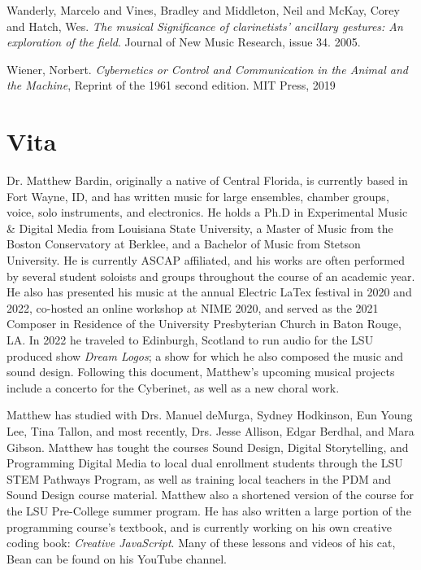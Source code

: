 \begin{thebibliography}{99}
 Wanderly, Marcelo and Vines, Bradley and Middleton, Neil and McKay, Corey and Hatch, Wes. \emph{The musical Significance of clarinetists' ancillary gestures: An exploration of the field}. Journal of New Music Research, issue 34. 2005.

 Wiener, Norbert. \emph{Cybernetics or Control and Communication in the Animal and the Machine}, Reprint of the 1961 second edition. MIT Press, 2019




\end{thebibliography}


\chapter{Vita}

Dr. Matthew Bardin, originally a native of Central Florida, is currently based in Fort Wayne, ID, and has written music for large ensembles, chamber groups, voice, solo instruments, and electronics. He holds a Ph.D in Experimental Music \& Digital Media from Louisiana State University, a Master of Music from the Boston Conservatory at Berklee, and a  Bachelor of Music from Stetson University. He is currently ASCAP affiliated, and his works are often performed by several student soloists and groups throughout the course of an academic year. He also has presented his music at the annual Electric LaTex festival in 2020 and 2022, co-hosted an online workshop at NIME 2020, and served as the 2021 Composer in Residence of the University Presbyterian Church in Baton Rouge, LA. In 2022 he traveled to Edinburgh, Scotland to run audio for the LSU produced show \textit{Dream Logos}; a show for which he also composed the music and sound design. Following this document, Matthew's upcoming musical projects include a concerto for the Cyberinet, as well as a new choral work.

Matthew has studied with Drs. Manuel deMurga, Sydney Hodkinson, Eun Young Lee, Tina Tallon, and most recently, Drs. Jesse Allison, Edgar Berdhal, and Mara Gibson. Matthew has tought the courses Sound Design, Digital Storytelling, and Programming Digital Media to local dual enrollment students through the LSU STEM Pathways Program, as well as training local teachers in the PDM and Sound Design course material. Matthew also a shortened version of the course for the LSU Pre-College summer program. He has also written a large portion of the programming course's textbook, and is currently working on his own creative coding book: \textit{Creative JavaScript}. Many of these lessons and videos of his cat, Bean can be found on his YouTube channel.

